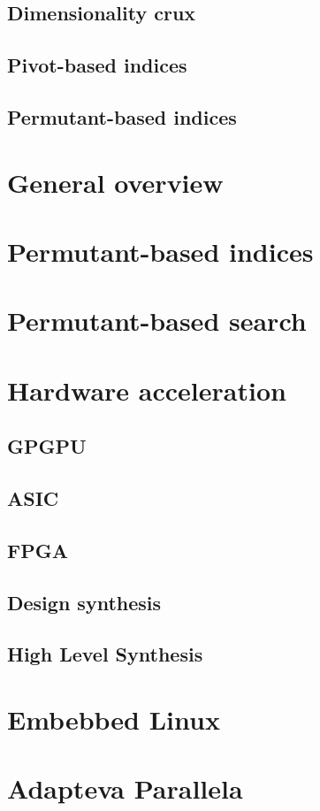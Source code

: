\documentclass{iccmemoria}
\begin{document}
    \subsection{Dimensionality crux}
    \subsection{Pivot-based indices}
    \subsection{Permutant-based indices}
  \section{General overview}
  \section{Permutant-based indices}
  \section{Permutant-based search}
  \section{Hardware acceleration}
    \subsection{GPGPU}
    \subsection{ASIC}
    \subsection{FPGA}
    \subsection{Design synthesis}
    \subsection{High Level Synthesis}
  \section{Embebbed Linux} 
  \section{Adapteva Parallela} 
\end{document}

